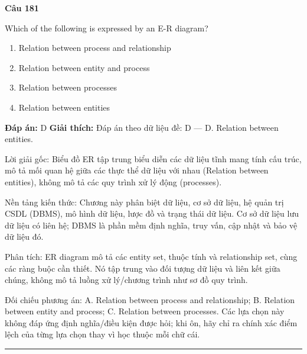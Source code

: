 \documentclass[11pt,a4paper]{article}
\newenvironment{question}[1]{%
  \par\vspace{1em}\noindent\textbf{\large Câu #1}\par\vspace{0.4em}
}{%
  \par\vspace{1em}\hrule\vspace{0.6em}
}
\newenvironment{choices}{%
  \begin{enumerate}[label=\textbf{\Alph*.},leftmargin=2.2em,itemsep=2pt,topsep=3pt]
}{%
  \end{enumerate}
}
\newcommand{\choice}{\item}
\begin{document}
\begin{question}{181}
Which of the following is expressed by an E-R diagram?
\begin{choices}
\choice Relation between process and relationship
\choice Relation between entity and process
\choice Relation between processes
\choice Relation between entities
\end{choices}
\textbf{Đáp án:} D
\textbf{Giải thích:} Đáp án theo dữ liệu đề: D — D. Relation between entities.

Lời giải gốc: Biểu đồ ER tập trung biểu diễn các dữ liệu tĩnh mang tính cấu trúc, mô tả mối quan hệ giữa các thực thể dữ liệu với nhau (Relation between entities), không mô tả các quy trình xử lý động (processes).

Nền tảng kiến thức: Chương này phân biệt dữ liệu, cơ sở dữ liệu, hệ quản trị CSDL (DBMS), mô hình dữ liệu, lược đồ và trạng thái dữ liệu. Cơ sở dữ liệu lưu dữ liệu có liên hệ; DBMS là phần mềm định nghĩa, truy vấn, cập nhật và bảo vệ dữ liệu đó.

Phân tích: ER diagram mô tả các entity set, thuộc tính và relationship set, cùng các ràng buộc cần thiết. Nó tập trung vào đối tượng dữ liệu và liên kết giữa chúng, không mô tả luồng xử lý/chương trình như sơ đồ quy trình.

Đối chiếu phương án: A. Relation between process and relationship; B. Relation between entity and process; C. Relation between processes. Các lựa chọn này không đáp ứng định nghĩa/điều kiện được hỏi; khi ôn, hãy chỉ ra chính xác điểm lệch của từng lựa chọn thay vì học thuộc mỗi chữ cái.
\end{question}
\end{document}
